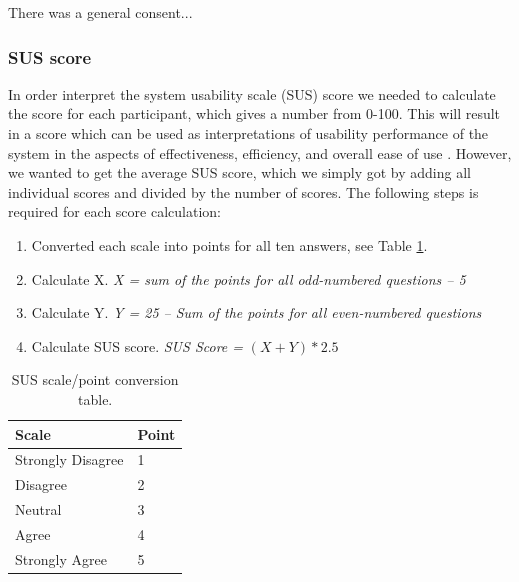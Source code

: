 There was a general consent...





\subsubsection{SUS score}
In order interpret the system usability scale (SUS) score we needed to calculate the score for each participant, which gives a number from 0-100. This will result in a score which can be used as interpretations of usability performance of the system in the aspects of effectiveness, efficiency, and overall ease of use \cite{SusMeasuringInterpret}. However, we wanted to get the average SUS score, which we simply got by adding all individual scores and divided by the number of scores. The following steps is required for each score calculation: 


\begin{enumerate}
  \item Converted each scale into points for all ten answers, see Table \ref{table:SUSconversionPoints}. 
  \item Calculate X. \textit{X = sum of the points for all odd-numbered questions – 5}  
  \item Calculate Y. \textit{Y =  25 – Sum of the points for all even-numbered questions}
  \item Calculate SUS score. \textit{SUS Score =} $(X + Y) * 2.5$ 
\end{enumerate}


\begin{table}[H]
\centering
\begin{tabular}{l|l}
{ \textbf{Scale}} & { \textbf{Point}} \\ \hline
Strongly Disagree                     & 1                                     \\ 
Disagree                              & 2                                     \\ 
Neutral                               & 3                                     \\ 
Agree                                 & 4                                     \\ 
Strongly Agree                        & 5                                     \\ 
\end{tabular}
\caption{SUS scale/point conversion table.}
\label{table:SUSconversionPoints}
\end{table}

